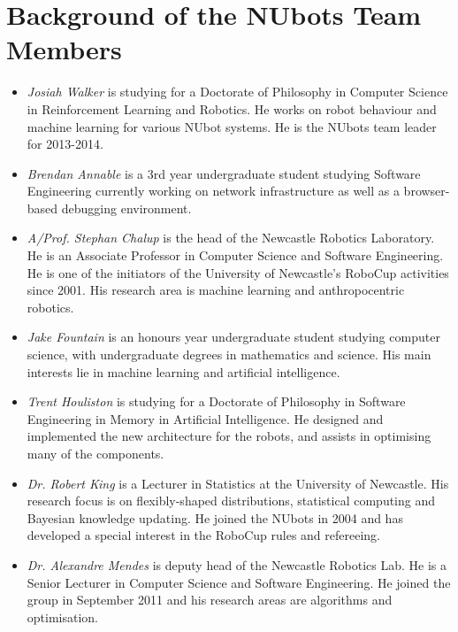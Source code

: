 \documentclass{llncs}
\begin{document}
\section{Background of the NUbots Team Members}
\begin{itemize}
\item \emph{Josiah Walker} is studying for a Doctorate of Philosophy in Computer Science in Reinforcement Learning and Robotics. He works on robot behaviour and machine learning for various NUbot systems. He is the NUbots team leader for 2013-2014.

\item \emph{Brendan Annable} is a 3rd year undergraduate student studying Software Engineering currently working on network infrastructure as well as a browser-based debugging environment.

\item \emph{A/Prof. Stephan Chalup} is the head of the Newcastle Robotics
Laboratory. He is an Associate Professor in Computer Science and Software Engineering.
He is one of the initiators of the University of Newcastle's
RoboCup activities since 2001. His research area is machine learning
and anthropocentric robotics.

\item \emph{Jake Fountain} is an honours year undergraduate student studying computer science, with undergraduate degrees in mathematics and science. His main interests lie in machine learning and artificial intelligence.

\item \emph{Trent Houliston} is studying for a Doctorate of Philosophy in Software Engineering in Memory in Artificial Intelligence. He designed and implemented the new architecture for the robots, and assists in optimising many of the components.

\item \emph{Dr. Robert King} is a Lecturer in Statistics at the University of Newcastle. His research focus is on flexibly-shaped distributions,
statistical computing and Bayesian knowledge updating. He joined the
NUbots in 2004 and has developed a special interest in the RoboCup rules and refereeing.

\item \emph{Dr. Alexandre Mendes} is deputy head of the Newcastle Robotics Lab. He is a Senior Lecturer in Computer Science and Software Engineering. He joined the group in September 2011 and his research areas are algorithms and optimisation.


\end{itemize}
\end{document}
